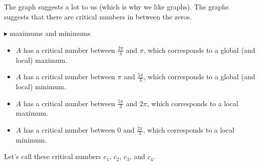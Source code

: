 \documentclass{ximera}
\begin{document}
The graph suggests a lot to us (which is why we like graphs).  The graphs suggests that there are critical numbers in between the zeros.







$\blacktriangleright$ maximums and minimums

\begin{itemize}
\item $A$ has a critical number between $\frac{2\pi}{3}$ and $\pi$, which corresponds to a global (and local) maximum.
\item $A$ has a critical number between $\pi$ and $\frac{5\pi}{3}$, which corresponds to a global (and local) minimum.
\item $A$ has a critical number between $\frac{5\pi}{3}$ and $2\pi$, which corresponds to a local maximum.
\item $A$ has a critical number between $0$ and $\frac{2\pi}{3}$, which corresponds to a local minimum.
\end{itemize}


Let's call these critical numbers $c_1$, $c_2$, $c_3$, and $c_4$.
\end{document}
